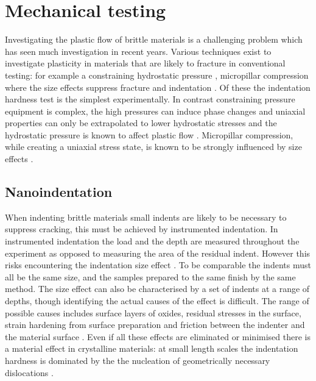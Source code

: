\section{Mechanical testing}
\label{sec:Ti2Ni_mechtesting}

Investigating the plastic flow of brittle materials is a challenging problem which has seen much investigation in recent years. Various techniques exist to investigate plasticity in materials that are likely to fracture in conventional testing: for example a constraining hydrostatic pressure \cite{Griggs1936,Weinrich1975,Borvin1990}, micropillar compression where the size effects suppress fracture \cite{Uchic2004} and indentation \cite{Cripps2011,tabor2000hardness,Marsh1964,Korte2009}. Of these the indentation hardness test is the simplest experimentally. In contrast constraining pressure equipment is complex, the high pressures can induce phase changes and uniaxial properties can only be extrapolated to lower hydrostatic stresses and the hydrostatic pressure is known to affect plastic flow \cite{frost1982pressure}. Micropillar compression, while creating a uniaxial stress state, is known to be strongly influenced by size effects \cite{Uchic2004,Greer2005,Greer2006corrigendum}.


\subsection{Nanoindentation}

When indenting brittle materials small indents are likely to be necessary to suppress cracking, this must be achieved by instrumented indentation. In instrumented indentation the load and the depth are measured throughout the experiment as opposed to measuring the area of the residual indent. However this risks encountering the indentation size effect \cite{Korte2009,Cripps2011}. To be comparable the indents must all be the same size, and the samples prepared to the same finish by the same method. The size effect can also be characterised by a set of indents at a range of depths, though identifying the actual causes of the effect is difficult. The range of possible causes includes  surface layers of oxides, residual stresses in the surface, strain hardening from surface preparation and friction between the indenter and the material surface \cite{Cripps2011}. Even if all these effects are eliminated or minimised there is a material effect in crystalline materials: at small length scales the indentation hardness is dominated by the the nucleation of geometrically necessary dislocations \cite{Cripps2011}.


